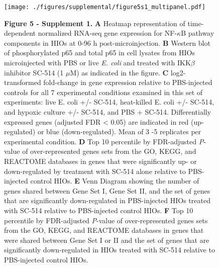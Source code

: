 \documentclass[9pt,lineo]{elife}
\begin{document}
\begin{figure}
\begin{fullwidth}
\centering\texttt{[image: ./figures/supplemental/figure5s1\_multipanel.pdf]}
\caption*{\textbf{Figure 5 - Supplement 1. } \textbf{A} Heatmap representation of time-dependent normalized RNA-seq gene expression for NF-$\kappa$B pathway components in HIOs at 0-96 h post-microinjection. \textbf{B} Western blot of phosphorylated p65 and total p65 in cell lysates from HIOs microinjected with PBS or live \textit{E. coli} and treated with IKK$\beta$ inhibitor SC-514 (1 $\mu$M) as indicated in the figure. \textbf{C} log2-transformed fold-change in gene expression relative to PBS-injected controls for all 7 experimental conditions examined in this set of experiments: live E. coli +/- SC-514, heat-killed E. coli +/- SC-514, and hypoxic culture +/- SC-514, and PBS + SC-514. Differentially expressed genes (adjusted FDR < 0.05) are indicated in red (up-regulated) or blue (down-regulated). Mean of 3 -5 replicates per experimental condition. \textbf{D} Top 10 percentile by FDR-adjusted \textit{P}-value of over-represented genes sets from the GO, KEGG, and REACTOME databases in genes that were significantly up- or down-regulated by treatment with SC-514 alone relative to PBS-injected control HIOs. \textbf{E} Venn Diagram showing the number of genes shared between Gene Set I, Gene Set II, and the set of genes that are significantly down-regulated in PBS-injected HIOs treated with SC-514 relative to PBS-injected control HIOs. \textbf{F} Top 10 percentile by FDR-adjusted \textit{P}-value of  over-represented genes sets from the GO, KEGG, and REACTOME databases in genes that were shared between Gene Set I or II and the set of genes that are significantly down-regulated in HIOs treated with SC-514 relative to PBS-injected control HIOs.}
\label{fig:fullwidth}
\end{fullwidth}
\end{figure}
\end{document}
